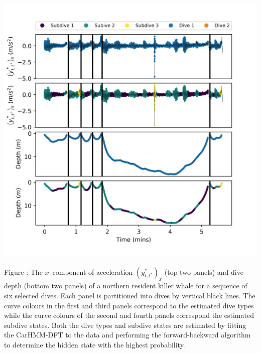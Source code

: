 \documentclass{article}
\begin{document}
        \begin{center}
        \includegraphics[width=6in]{../Plots/2019/20190902-182840-CATs_OB_1_0_267_CarHMM_decoded_dives.png}
        \end{center}
        
        \noindent Figure : The $x$--component of acceleration $\left(y^*_{t,t^*}\right)_x$ (top two panels) and dive depth (bottom two panels) of a northern resident killer whale for a sequence of six selected dives. Each panel is partitioned into dives by vertical black lines. The curve colours in the first and third panels correspond to the estimated dive types while the curve colours of the second and fourth panels correspond the estimated subdive states. Both the dive types and subdive states are estimated by fitting the CarHMM-DFT to the data and performing the forward-backward algorithm to determine the hidden state with the highest probability.
        \addtocounter{fignum}{1}
        
\end{document}
